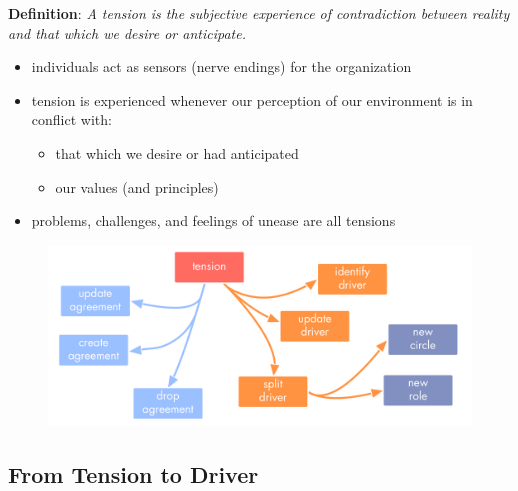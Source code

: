 \textbf{Definition}: \emph{A tension is the subjective experience of contradiction between reality and that which we desire or anticipate.}

\begin{itemize}
\item individuals act as sensors (nerve endings) for the organization

\item tension is experienced whenever our perception of our environment is in conflict with:

\begin{itemize}
\item that which we desire or had anticipated

\item our values (and principles)

\end{itemize}

\item problems, challenges, and feelings of unease are all tensions

\end{itemize}

\begin{figure}[htbp]
\centering
\includegraphics[keepaspectratio,width=\textwidth,height=0.75\textheight]{img/tension-driver-domain/navigate-via-tensions.png}
\end{figure}

\subsection{From Tension to Driver}
\label{fromtensiontodriver}

